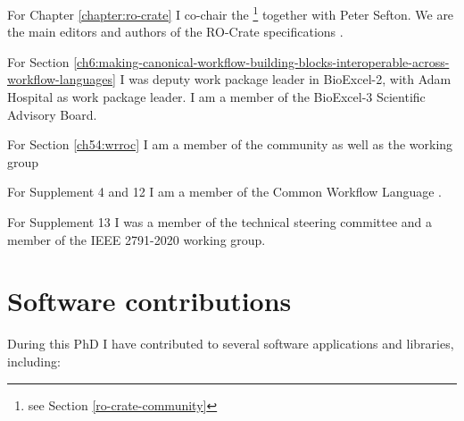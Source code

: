 For Chapter \ref{chapter:ro-crate} I co-chair the \footnote{see Section \vref{ro-crate-community}} together with Peter Sefton. We are the main editors and authors of the RO-Crate specifications \cite{RO-Crate 1.0,RO-Crate 1.1,RO-Crate 1.1.3,RO-Crate 1.2}.

For Section \ref{ch6:making-canonical-workflow-building-blocks-interoperable-across-workflow-languages} I was deputy work package leader in BioExcel-2, with Adam
Hospital as work package leader. I am a member of the BioExcel-3 Scientific Advisory Board.

For Section \ref{ch54:wrroc} I am a member of the  community as well as the 
 working group 

For Supplement 4 \cite{Crusoe 2022} and 12 \cite{Khan 2019} I am a member of the Common Workflow Language .

For Supplement 13 \cite{IEEE 2791-2020} I was a member of the
 technical
steering committee and a member of the IEEE 2791-2020 working
group.



\section{Software contributions}

During this PhD I have contributed to several software applications and libraries, including:

